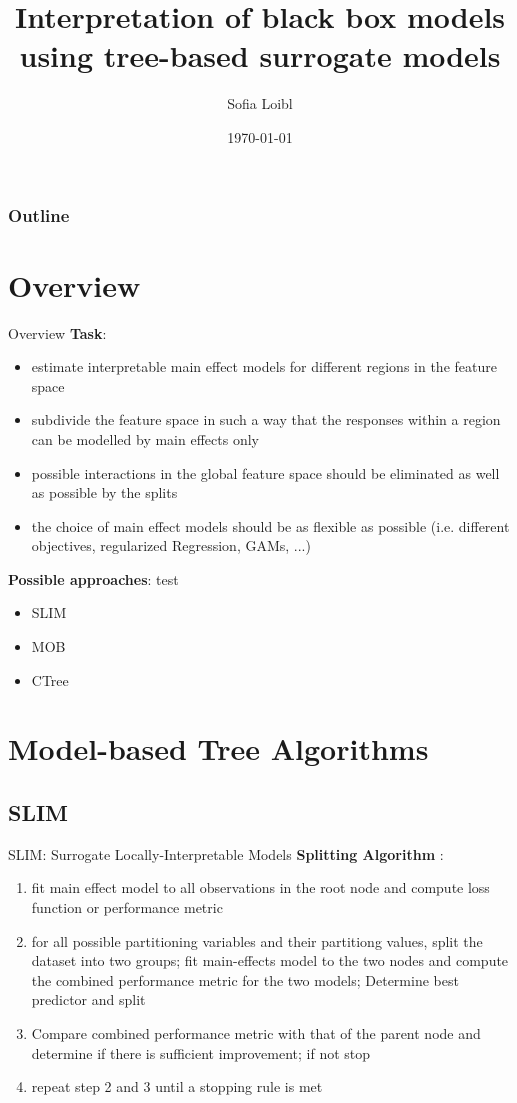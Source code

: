 \documentclass[9pt, xcolor=table]{beamer}
\title[Interpretation of black box models]{Interpretation of black box models using tree-based surrogate models}
\author[Sofia Loibl]{Sofia Loibl}
\institute[LMU]{LMU München}
\date{\today}
\begin{document}
\begin{frame}
\titlepage 
\end{frame}

\begin{frame}
\frametitle{Outline} 
\tableofcontents 
\end{frame}

\section{Overview}
\begin{frame}{Overview}
\textbf{Task}:
\begin{itemize}
    \item estimate interpretable main effect models for different regions in the feature space
    \item subdivide the feature space in such a way that the responses within a region can be modelled by main effects only
    \item possible interactions in the global feature space should be eliminated as well as possible by the splits
    \item the choice of main effect models should be as flexible as possible (i.e. different objectives, regularized Regression, GAMs, ...)
\end{itemize}
    
\vspace{0.5cm}

\textbf{Possible approaches}:
test
\begin{itemize}
    \item SLIM
    \item MOB
    \item CTree
\end{itemize}
\end{frame}


\section{Model-based Tree Algorithms}
\subsection{SLIM}
\begin{frame}{SLIM: Surrogate Locally-Interpretable Models}
\textbf{Splitting Algorithm} \citep{Hu.2020}:
\begin{enumerate}
    \item fit main effect model to all observations in the root node and compute loss function or performance metric
    \item for all possible partitioning variables and their partitiong values, split the dataset into two groups; fit main-effects model to the two nodes and compute the combined performance metric for the two models; Determine best predictor and split
    \item Compare combined performance metric with that of the parent node and determine if there is sufficient improvement; if not stop
    \item repeat step 2 and 3 until a stopping rule is met
\end{enumerate}
    
\end{frame}
\end{document}
